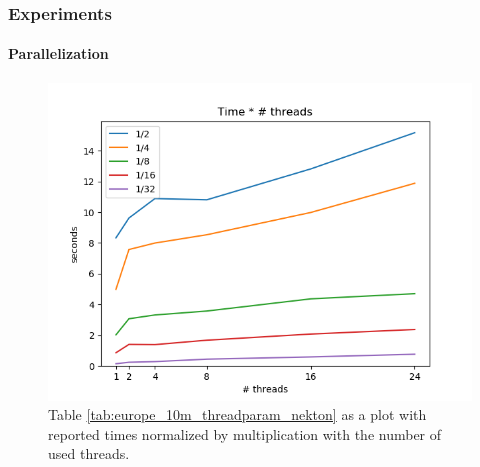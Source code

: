 \documentclass[10pt, t,
aspectratio=169,%
]{beamer}
\newcommand{\traj}[2]{\mathcal{T}_{\text{#1},\text{#2}}}
\begin{document}
\begin{frame}
	\frametitle{Experiments}
	\framesubtitle{Parallelization}
	\begin{figure}
		\centering
		\includegraphics[width=\linewidth]{graphics/normalized_thread_times.png}
		\caption{Table \ref{tab:europe_10m_threadparam_nekton} as a plot with reported times normalized by multiplication with the number of used threads.}
		\label{fig:normalized_thread_times}
	\end{figure}
\end{frame}


\end{document}
